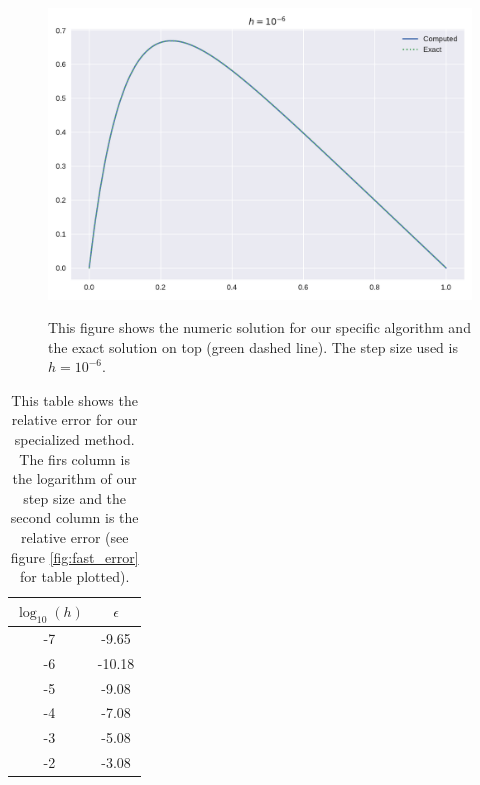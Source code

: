 \documentclass[reprint, english,notitlepage]{revtex4-1}  %
\begin{document}
\begin{figure}[h]
	\centering
	\includegraphics[scale=0.5]{../output/fast_6.pdf}
	\label{fig:fast_6}
	\caption{This figure shows the numeric solution for our specific algorithm and the exact solution on top (green dashed line). The step size used is $h=10^{-6}$.} 
\end{figure}

\begin{table} [h]  %
	\begin{tabular}{||c | c||}
			\hline
			$\log_{10}(h)$ & $\epsilon$    \\ \hline
			-7 & -9.65    \\ \hline
			-6 & -10.18    \\ \hline
			-5 & -9.08    \\ \hline
			-4 & -7.08    \\ \hline
			-3 & -5.08    \\ \hline
			-2 & -3.08    \\ \hline
	\end{tabular}
	\caption{This table shows the relative error for our specialized method. The firs column is the logarithm of our step size and the second column is the relative error (see figure \ref{fig:fast_error} for table plotted).}
	\label{tab:fast_error}
\end{table}
\end{document}
